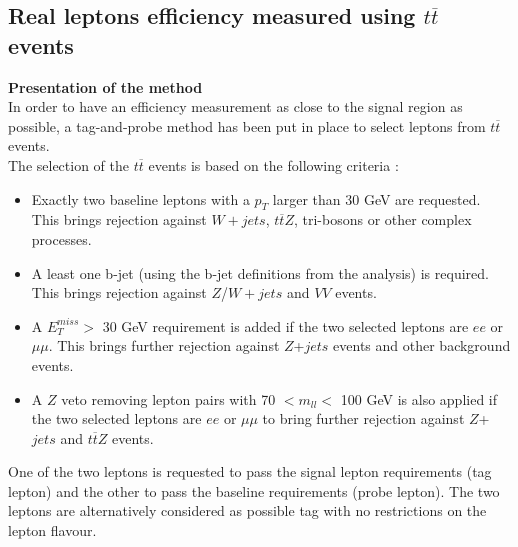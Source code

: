 	\subsection{Real leptons efficiency measured using $t\overline{t}$ events}
	\label{App:RealEff_ttbar_TandP}	
	\par{\bf Presentation of the method \\}
	In order to have an efficiency measurement as close to the signal region as possible, a tag-and-probe method has been put in place to select leptons from $t\overline{t}$ events. \\
	The selection of the $t\overline{t}$ events is based on the following criteria :
	\begin{itemize}
		\item Exactly two baseline leptons with a $p_{T}$ larger than 30 GeV are requested. This brings rejection against $W+jets$, $t\overline{t}Z$, tri-bosons or other complex processes.		
		\item A least one b-jet (using the b-jet definitions from the analysis) is required. This brings rejection against $Z$/$W+jets$ and $VV$ events.
		\item A $E_{T}^{miss} >$ 30 GeV requirement is added if the two selected leptons are $ee$ or $\mu\mu$. This brings further rejection against $Z$+$jets$ events and other background events.
		\item A $Z$ veto removing lepton pairs with 70 $< m_{ll} <$ 100 GeV is also applied if the two selected leptons are $ee$ or $\mu\mu$ to bring further rejection against $Z$+$jets$ and $t\overline{t}Z$ events.
	\end{itemize}
	One of the two leptons is requested to pass the signal lepton requirements (tag lepton) and the other to pass the baseline requirements (probe lepton). The two leptons are alternatively considered as possible tag with no restrictions on the lepton flavour. 
		
